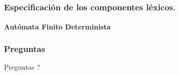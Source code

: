 \documentclass{beamer}
\begin{document}
		\begin{frame}
			\frametitle{Especificaci\'on de los componentes l\'exicos.}
			\framesubtitle{Aut\'omata Finito Determinista}
			
			\begin{figure}[H]
			    \begin{center}
			    \end{center}
			\end{figure}
		\end{frame}	

		\begin{frame}
			\frametitle{Preguntas}

			\hspace{4cm}\huge{Preguntas ?}
		
		\end{frame}
	
\end{document}
